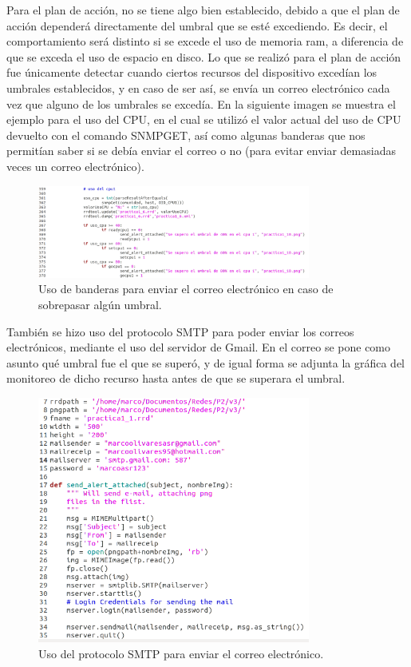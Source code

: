 Para el plan de acción, no se tiene algo bien establecido, debido a que el plan de acción dependerá directamente del umbral que se esté excediendo. Es decir, el comportamiento será distinto si se excede el uso de memoria ram, a diferencia de que se exceda el uso de espacio en disco.
\newline
Lo que se realizó para el plan de acción fue únicamente detectar cuando ciertos recursos del dispositivo excedían los umbrales establecidos, y en caso de ser así, se envía un correo electrónico cada vez que alguno de los umbrales se excedía.
\newline
En la siguiente imagen se muestra el ejemplo para el uso del CPU, en el cual se utilizó el valor actual del uso de CPU devuelto con el comando SNMPGET, así como algunas banderas que nos permitían saber si se debía enviar el correo o no (para evitar enviar demasiadas veces un correo electrónico).

\pagebreak
\begin{figure}[htbp!]
	\centering
		\includegraphics[width=0.8\textwidth]{imagenes/LineaBase/envioAlertaLineaBase.png}
	\caption{Uso de banderas para enviar el correo electrónico en caso de sobrepasar algún umbral.}
\end{figure}

También se hizo uso del protocolo SMTP para poder enviar los correos electrónicos, mediante el uso del servidor de Gmail. En el correo se pone como asunto qué umbral fue el que se superó, y de igual forma se adjunta la gráfica del monitoreo de dicho recurso hasta antes de que se superara el umbral.

\pagebreak
\begin{figure}[htbp!]
	\centering
		\includegraphics[width=0.8\textwidth]{imagenes/EnvioEmail.png}
	\caption{Uso del protocolo SMTP para enviar el correo electrónico.}
\end{figure}